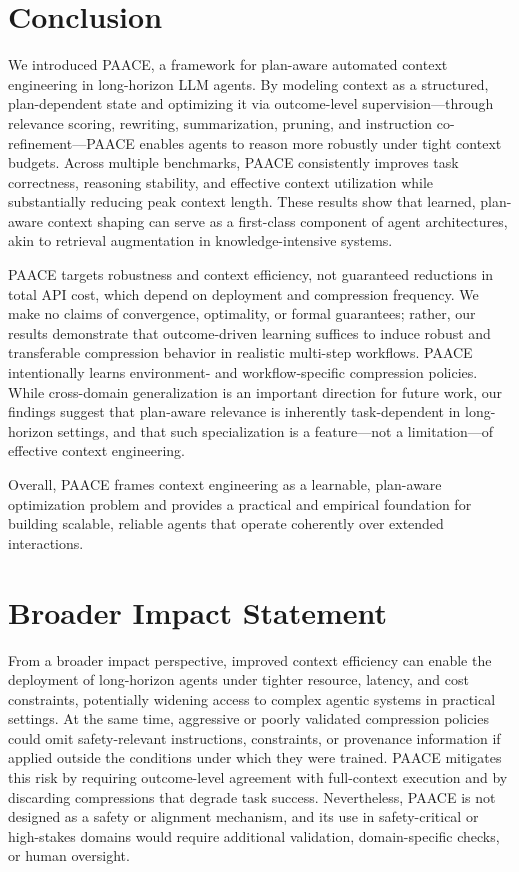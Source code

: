\documentclass{article}
\theoremstyle{plain}
\theoremstyle{definition}
\theoremstyle{remark}
\begin{document}
\section{Conclusion}

We introduced PAACE, a framework for plan-aware automated context engineering in long-horizon LLM agents. By modeling context as a structured, plan-dependent state and optimizing it via outcome-level supervision—through relevance scoring, rewriting, summarization, pruning, and instruction co-refinement—PAACE enables agents to reason more robustly under tight context budgets. Across multiple benchmarks, PAACE consistently improves task correctness, reasoning stability, and effective context utilization while substantially reducing peak context length. These results show that learned, plan-aware context shaping can serve as a first-class component of agent architectures, akin to retrieval augmentation in knowledge-intensive systems.

PAACE targets robustness and context efficiency, not guaranteed reductions in total API cost, which depend on deployment and compression frequency. We make no claims of convergence, optimality, or formal guarantees; rather, our results demonstrate that outcome-driven learning suffices to induce robust and transferable compression behavior in realistic multi-step workflows. PAACE intentionally learns environment- and workflow-specific compression policies. While cross-domain generalization is an important direction for future work, our findings suggest that plan-aware relevance is inherently task-dependent in long-horizon settings, and that such specialization is a feature—not a limitation—of effective context engineering. 

Overall, PAACE frames context engineering as a learnable, plan-aware optimization problem and provides a practical and empirical foundation for building scalable, reliable agents that operate coherently over extended interactions.

\section*{Broader Impact Statement}

From a broader impact perspective, improved context efficiency can enable the deployment of long-horizon agents under tighter resource, latency, and cost constraints, potentially widening access to complex agentic systems in practical settings. At the same time, aggressive or poorly validated compression policies could omit safety-relevant instructions, constraints, or provenance information if applied outside the conditions under which they were trained. PAACE mitigates this risk by requiring outcome-level agreement with full-context execution and by discarding compressions that degrade task success. Nevertheless, PAACE is not designed as a safety or alignment mechanism, and its use in safety-critical or high-stakes domains would require additional validation, domain-specific checks, or human oversight.






\end{document}
